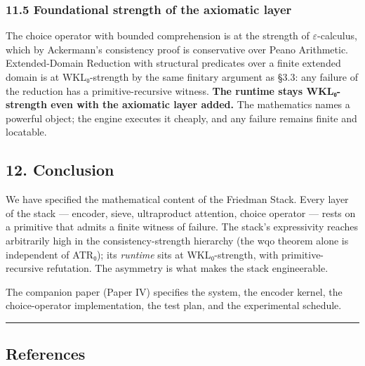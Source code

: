 \documentclass[
  11pt,
]{article}
\begin{document}
\hypertarget{foundational-strength-of-the-axiomatic-layer}{%
\subsubsection{11.5 Foundational strength of the axiomatic
layer}\label{foundational-strength-of-the-axiomatic-layer}}

The choice operator with bounded comprehension is at the strength of
\(\varepsilon\)-calculus, which by Ackermann's consistency proof is
conservative over Peano Arithmetic. Extended-Domain Reduction with
structural predicates over a finite extended domain is at WKL₀-strength
by the same finitary argument as §3.3: any failure of the reduction has
a primitive-recursive witness. \textbf{The runtime stays WKL₀-strength
even with the axiomatic layer added.} The mathematics names a powerful
object; the engine executes it cheaply, and any failure remains finite
and locatable.

\hypertarget{conclusion}{%
\subsection{12. Conclusion}\label{conclusion}}

We have specified the mathematical content of the Friedman Stack. Every
layer of the stack --- encoder, sieve, ultraproduct attention, choice
operator --- rests on a primitive that admits a finite witness of
failure. The stack's expressivity reaches arbitrarily high in the
consistency-strength hierarchy (the wqo theorem alone is independent of
ATR₀); its \emph{runtime} sits at WKL₀-strength, with
primitive-recursive refutation. The asymmetry is what makes the stack
engineerable.

The companion paper (Paper IV) specifies the system, the encoder kernel,
the choice-operator implementation, the test plan, and the experimental
schedule.

\begin{center}\rule{0.5\linewidth}{0.5pt}\end{center}

\hypertarget{references}{%
\subsection{References}\label{references}}
\end{document}
